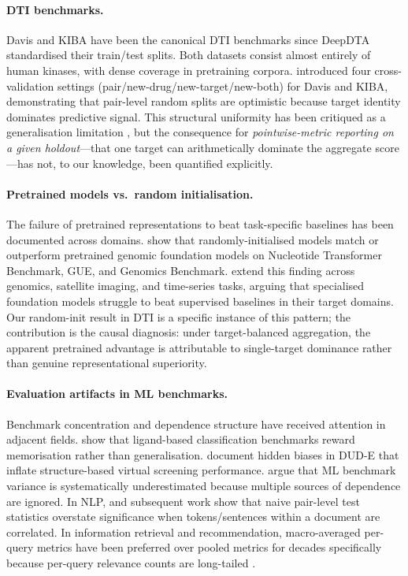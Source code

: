 \documentclass[11pt,a4paper]{article}
\begin{document}
\paragraph{DTI benchmarks.}
Davis \citep{davis2011comprehensive} and KIBA \citep{tang2014making} have been
the canonical DTI benchmarks since DeepDTA \citep{ozturk2018deepdta}
standardised their train/test splits.
Both datasets consist almost entirely of human kinases, with dense coverage in
pretraining corpora.
\citet{pahikkala2015toward} introduced four cross-validation settings
(pair/new-drug/new-target/new-both) for Davis and KIBA, demonstrating that
pair-level random splits are optimistic because target identity dominates
predictive signal.
This structural uniformity has been critiqued as a generalisation limitation
\citep{wallach2018most,bender2022evaluation}, but the consequence for
\emph{pointwise-metric reporting on a given holdout}---that one target can
arithmetically dominate the aggregate score---has not, to our knowledge,
been quantified explicitly.

\paragraph{Pretrained models vs.\ random initialisation.}
The failure of pretrained representations to beat task-specific baselines
has been documented across domains.
\citet{vishniakov2024genomic} show that randomly-initialised models match or
outperform pretrained genomic foundation models on Nucleotide Transformer
Benchmark, GUE, and Genomics Benchmark.
\citet{xu2025specialized} extend this finding across genomics, satellite
imaging, and time-series tasks, arguing that specialised foundation models
struggle to beat supervised baselines in their target domains.
Our random-init result in DTI is a specific instance of this pattern;
the contribution is the causal diagnosis: under target-balanced aggregation,
the apparent pretrained advantage is attributable to
single-target dominance rather than genuine representational superiority.

\paragraph{Evaluation artifacts in ML benchmarks.}
Benchmark concentration and dependence structure have received attention in
adjacent fields.
\citet{wallach2018most} show that ligand-based classification benchmarks reward
memorisation rather than generalisation.
\citet{chen2019hidden} document hidden biases in DUD-E that inflate structure-based
virtual screening performance.
\citet{bouthillier2021accounting} argue that ML benchmark variance is
systematically underestimated because multiple sources of dependence are ignored.
In NLP, \citet{sogaard2014test} and subsequent work show that naive pair-level
test statistics overstate significance when tokens/sentences within a document
are correlated.
In information retrieval and recommendation, macro-averaged per-query metrics
have been preferred over pooled metrics for decades specifically because
per-query relevance counts are long-tailed \citep{voorhees2004overview}.
\end{document}
